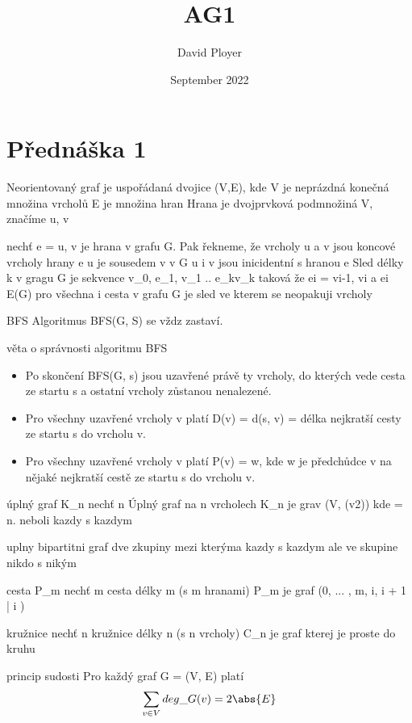 \documentclass{article}
\title{AG1}
\author{David Ployer}
\date{September 2022}
\begin{document}
\maketitle
\section{Přednáška 1}
Neorientovaný graf je uspořádaná dvojice (V,E), kde 
	V je neprázdná konečná množina vrcholů
	E je množina hran
Hrana je dvojprvková podmnožiná V, značíme {u, v}

nechť e = {u, v}  je hrana v grafu G. Pak řekneme, že 
	vrcholy u a v jsou koncové vrcholy hrany e
	u je sousedem v v G
	u i v jsou inicidentní s hranou e
Sled délky k v gragu G je sekvence v\_0, e\_1, v\_1 .. e\_kv\_k taková  že ei = {vi-1, vi} a ei \in E(G) pro všechna i
cesta v grafu G je sled ve kterem se neopakuji vrcholy

BFS
	Algoritmus BFS(G, S) se vždz zastaví.
	
	věta o správnosti algoritmu BFS
\begin{itemize}
	\item Po skončení BFS(G, s) jsou uzavřené právě ty vrcholy,
	do kterých vede cesta ze startu s a ostatní vrcholy
zůstanou nenalezené.

	\item Pro všechny uzavřené vrcholy v platí D(v) = d(s, v) =
	délka nejkratší cesty ze startu s do vrcholu v.

	\item Pro všechny uzavřené vrcholy v platí P(v) = w, kde w
	je předchůdce v na nějaké nejkratší cestě ze startu s do
vrcholu v.
\end{itemize}

úplný graf K\_{n}
nechť n 
Úplný graf na n vrcholech K\_n je grav (V, (v2)) kde  = n.
neboli kazdy s kazdym

uplny bipartitni graf
dve zkupiny mezi kterýma kazdy s kazdym ale ve skupine nikdo s nikým

cesta P\_m
nechť m  
cesta délky m (s m hranami) P\_m je graf 
({0, ... , m}, {{i, i + 1} | i })


kružnice 
nechť n 
kružnice délky n (s n vrcholy) C\_n je graf kterej je proste do kruhu

princip sudosti 
Pro každý graf G = (V, E) platí
$$\sum_{v \in V}deg\_{G}(v) = 2\abs{E} $$
\end{document}
